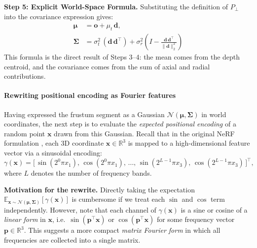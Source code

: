 \begin{enrichment}
\begin{enrichment}
    \medskip
    \noindent\textbf{Step 5: Explicit World-Space Formula.}
    Substituting the definition of \(P_{\perp}\) into the covariance expression gives:
    \begin{equation}
        \boxed{
            \begin{aligned}
                \boldsymbol{\mu} &= \mathbf{o} + \mu_t\,\mathbf{d}, \\
                \boldsymbol{\Sigma} &= \sigma_t^2\,(\mathbf{d}\,\mathbf{d}^{\top})
                + \sigma_r^2\!\left( I - \frac{\mathbf{d}\,\mathbf{d}^{\top}}{\|\mathbf{d}\|_2^{2}} \right)
            \end{aligned}
        }
        \label{eq:chapter23_mipnerf_gaussian}
    \end{equation}
    This formula is the direct result of Steps 3–4: the mean comes from the depth centroid, and the covariance comes from the sum of axial and radial contributions.
            
    \paragraph{Rewriting positional encoding as Fourier features}
    Having expressed the frustum segment as a Gaussian $\mathcal{N}(\boldsymbol{\mu}, \boldsymbol{\Sigma})$ in world coordinates, the next step is to evaluate the \emph{expected positional encoding} of a random point $\mathbf{x}$ drawn from this Gaussian.  
    Recall that in the original NeRF formulation \cite{mildenhall2020_nerf}, each 3D coordinate $\mathbf{x} \in \mathbb{R}^3$ is mapped to a high-dimensional feature vector via a sinusoidal encoding:
    \[
    \gamma(\mathbf{x})
    = \big[\,\sin(2^0\pi x_1),\, \cos(2^0\pi x_1),\,\dots,\,\sin(2^{L-1}\pi x_3),\,\cos(2^{L-1}\pi x_3) \,\big]^\top,
    \]
    where $L$ denotes the number of frequency bands.
    
    \medskip
    \noindent
    \textbf{Motivation for the rewrite.}  
    Directly taking the expectation $\mathbb{E}_{\mathbf{x} \sim \mathcal{N}(\boldsymbol{\mu}, \boldsymbol{\Sigma})}[\gamma(\mathbf{x})]$ is cumbersome if we treat each $\sin$ and $\cos$ term independently.  
    However, note that each channel of $\gamma(\mathbf{x})$ is a sine or cosine of a \emph{linear form} in $\mathbf{x}$, i.e.\ $\sin(\mathbf{p}^\top \mathbf{x})$ or $\cos(\mathbf{p}^\top \mathbf{x})$ for some frequency vector $\mathbf{p} \in \mathbb{R}^3$.  
    This suggests a more compact \emph{matrix Fourier form} in which all frequencies are collected into a single matrix.
    

\end{enrichment}
\end{enrichment}
